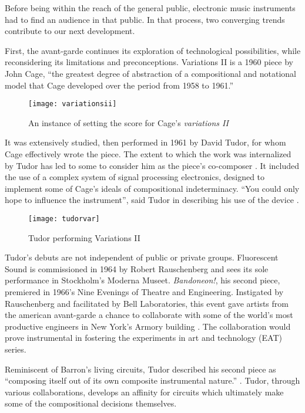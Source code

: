 \begin{itemize}
	Before being within the reach of the general public, electronic music instruments had to find an audience in that public. In that process, two converging trends contribute to our next development. 
	
	First, the avant-garde continues its exploration of technological possibilities, while reconsidering its limitations and preconceptions. Variations II is a 1960 piece by John Cage, “the greatest degree of abstraction of a compositional and notational model that Cage developed over the period from 1958 to 1961.”
	
\begin{figure}[h!]
  \caption{An instance of setting the score for Cage's \emph{variations II}}
  \centering
    \texttt{[image: variationsii]}
\end{figure}
	
	 It was extensively studied, then performed in 1961 by David Tudor, for whom Cage effectively wrote the piece. The extent to which the work was internalized by Tudor has led to some to consider him as the piece’s co-composer \citep{pritchett2004}. It included the use of a complex system of signal processing electronics, designed to implement some of Cage’s ideals of compositional indeterminacy. “You could only hope to influence the instrument”, said Tudor in describing his use of the device \citep{nakai2014}. 
	 
 	\begin{figure}[h!]
 	  \caption{Tudor performing Variations II}
 	  \centering
 	    \texttt{[image: tudorvar]}
 	\end{figure}

Tudor’s debuts are not independent of public or private groups. Fluorescent Sound is commissioned in 1964 by Robert Rauschenberg and sees its sole performance in Stockholm’s Moderna Museet. \emph{Bandoneon!}, his second piece, premiered in 1966’s Nine Evenings of Theatre and Engineering. Instigated by Rauschenberg and facilitated by Bell Laboratories, this event gave artists from the american avant-garde a chance to collaborate with some of the world’s most productive engineers in New York’s Armory building \citep{kuivila2004}. The collaboration would prove instrumental in fostering the experiments in art and technology (EAT) series. 
	
Reminiscent of Barron’s living circuits, Tudor described his second piece as “composing itself out of its own composite instrumental nature.”  \citep{tudor,kuivila2004}. Tudor, through various collaborations, develops an affinity for circuits which ultimately make some of the compositional decisions themselves. 


\end{itemize}
